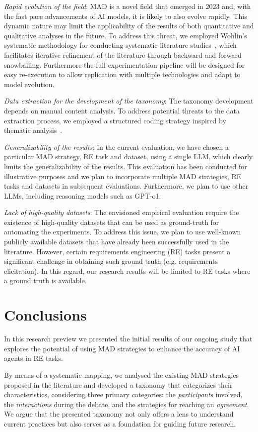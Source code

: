 \documentclass[conference]{IEEEtran}
\begin{document}
\textit{Rapid evolution of the field}: MAD is a novel field that emerged in 2023 and, with the fast pace advancements of AI models, it is likely to also evolve rapidly. This dynamic nature may limit the applicability of the results of both quantitative and qualitative analyses in the future. To address this threat, we employed Wohlin’s systematic methodology for conducting systematic literature studies~\cite{Wohlin2014}, which facilitates iterative refinement of the literature through backward and forward snowballing.  Furthermore the full experimentation pipeline will be designed for easy re-execution to allow replication with multiple technologies and adapt to model evolution.

\textit{Data extraction for the development of the taxonomy}: The taxonomy development depends on manual content analysis. To address potential threats to the data extraction process, we employed a structured coding strategy inspired by thematic analysis~\cite{Cruzes2011}.  

\textit{Generalizability of the results}: In the current evaluation, we have chosen a particular MAD strategy, RE task and dataset, using a single LLM, which clearly limits the  generalizability of the results. This evaluation has been conducted for illustrative purposes and we plan to incorporate multiple MAD strategies, RE tasks and datasets in subsequent evaluations. Furthermore, we plan to use other LLMs, including reasoning models such as GPT-o1.

\textit{Lack of high-quality datasets}: The envisioned empirical evaluation require the existence of high-quality datasets that can be used as ground-truth for automating the experiments. To address this issue, we plan to use well-known publicly available datasets that have already been successfully used in the literature. However, certain requirements engineering (RE) tasks present a significant challenge in obtaining such ground truth (e.g. requirements elicitation). In this regard, our research results will be limited to RE tasks where a ground truth is available. 

\section{Conclusions}
In this research preview we presented the initial results of our ongoing study that explores the potential of using MAD strategies to enhance the accuracy of AI agents in RE tasks. 

By means of a systematic mapping, we analysed the existing MAD strategies proposed in the literature and developed a taxonomy that categorizes their characteristics, considering three primary categories: the \textit{participants} involved, the \textit{interactions} during the debate, and the strategies for reaching an \textit{agreement}. We argue that the presented taxonomy not only offers a lens to understand current practices but also serves as a foundation for guiding future research.
\end{document}
